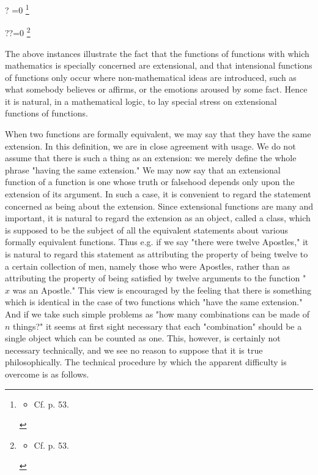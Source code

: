 \documentclass[10pt]{article}
\let\svthefootnote\thefootnote
\newcommand\blfootnotetext[1]{%
  \let\thefootnote\relax\footnote{#1}%
  \addtocounter{footnote}{-1}%
  \let\thefootnote\svthefootnote%
}
\let\svfootnotetext\footnotetext
\renewcommand\footnotetext[2][?]{%
  \if\relax#1\relax%
    \ifnum\value{footnote}=0\blfootnotetext{#2}\else\svfootnotetext{#2}\fi%
  \else%
    \if?#1\ifnum\value{footnote}=0\blfootnotetext{#2}\else\svfootnotetext{#2}\fi%
    \else\svfootnotetext[#1]{#2}\fi%
  \fi
}
\begin{document}
The above instances illustrate the fact that the functions of functions with which mathematics is specially concerned are extensional, and that intensional functions of functions only occur where non-mathematical ideas are introduced, such as what somebody believes or affirms, or the emotions aroused by some fact. Hence it is natural, in a mathematical logic, to lay special stress on extensional functions of functions.

When two functions are formally equivalent, we may say that they have the same extension. In this definition, we are in close agreement with usage. We do not assume that there is such a thing as an extension: we merely define the whole phrase "having the same extension." We may now say that an extensional function of a function is one whose truth or falsehood depends only upon the extension of its argument. In such a case, it is convenient to regard the statement concerned as being about the extension. Since extensional functions are many and important, it is natural to regard the extension as an object, called a class, which is supposed to be the subject of all the equivalent statements about various formally equivalent functions. Thus e.g. if we say "there were twelve Apostles," it is natural to regard this statement as attributing the property of being twelve to a certain collection of men, namely those who were Apostles, rather than as attributing the property of being satisfied by twelve arguments to the function " $\hat{x}$ was an Apostle." This view is encouraged by the feeling that there is something which is identical in the case of two functions which "have the same extension." And if we take such simple problems as "how many combinations can be made of $n$ things?" it seems at first sight necessary that each "combination" should be a single object which can be counted as one. This, however, is certainly not necessary technically, and we see no reason to suppose that it is true philosophically. The technical procedure by which the apparent difficulty is overcome is as follows.
\end{document}
